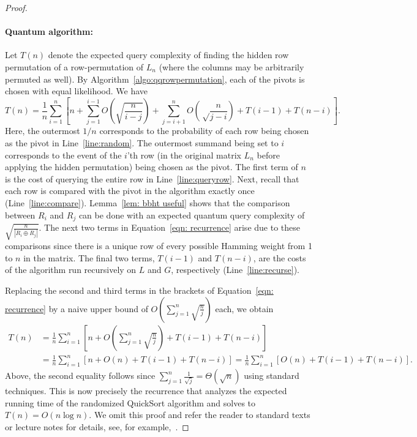 \documentclass[11pt]{article}
\begin{document}
\begin{proof}
    \paragraph*{Quantum algorithm:} Let $T(n)$ denote the expected query complexity of finding the hidden row permutation of a row-permutation of $L_n$ (where the columns may be arbitrarily permuted as well). By Algorithm~\ref{algo:qqrowpermutation}, each of the pivots is chosen with equal likelihood. We have
    \begin{equation}\label{eqn: recurrence}
        T(n) = \frac{1}{n}\sum_{i = 1}^n\left[n + \sum_{j = 1}^{i - 1}O\left(\sqrt{\frac{n}{i - j}}\right) + \sum_{j = i + 1}^nO\left(\sqrt\frac{n}{j - i}\right) + T(i - 1) + T(n - i)\right].
    \end{equation}
    Here, the outermost $1/n$ corresponds to the probability of each row being chosen as the pivot in Line~\ref{line:random}. The outermost summand being set to $i$ corresponds to the event of the $i$'th row (in the original matrix $L_n$ before applying the hidden permutation) being chosen as the pivot. The first term of $n$ is the cost of querying the entire row in Line~\ref{line:queryrow}. Next, recall that each row is compared with the pivot in the algorithm exactly once (Line~\ref{line:compare}). Lemma~\ref{lem: bbht useful} shows that the comparison between $R_i$ and $R_j$ can be done with an expected quantum query complexity of $\sqrt{\frac{n}{|R_i \oplus R_j|}}$. The next two terms in Equation~\eqref{eqn: recurrence} arise due to these comparisons since there is a unique row of every possible Hamming weight from 1 to $n$ in the matrix. The final  two terms, $T(i - 1)$ and $T(n - i)$, are the costs of the algorithm run recursively on $L$ and $G$, respectively (Line~\ref{line:recurse}).

    Replacing the second and third terms in the brackets of Equation~\eqref{eqn: recurrence} by a naive upper bound of $O\left(\sum_{j = 1}^n \sqrt{\frac{n}{j}}\right)$ each, we obtain    
    \begin{align*}
        T(n) & = \frac{1}{n}\sum_{i = 1}^n\left[n + O\left(\sum_{j = 1}^{n}\sqrt{\frac{n}{j}}\right) + T(i - 1) + T(n - i)\right]\\
        & = \frac{1}{n}\sum_{i = 1}^n\left[n + O(n) + T(i - 1) + T(n - i)\right] = \frac{1}{n}\sum_{i = 1}^n\left[O(n) + T(i - 1) + T(n - i) \right].
    \end{align*}
    Above, the second equality follows since $\sum_{j = 1}^n \frac{1}{\sqrt{j}} = \Theta(\sqrt{n})$ using standard techniques. This is now precisely the recurrence that analyzes the expected running time of the randomized QuickSort algorithm and solves to $T(n) = O(n \log n)$. We omit this proof and refer the reader to standard texts or lecture notes for details, see, for example,~\cite{CLRS}.
    

\end{proof}
\end{document}

